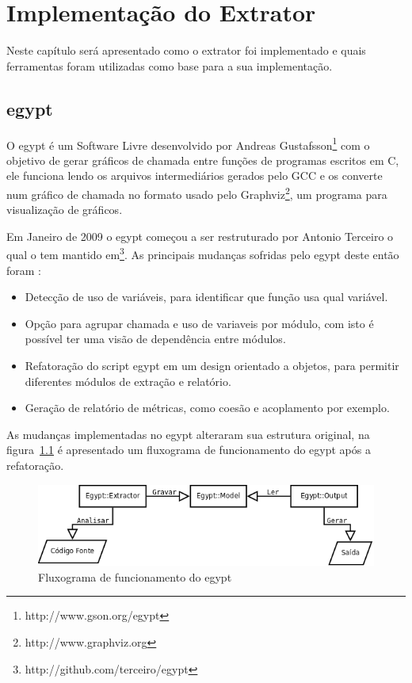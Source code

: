\chapter{Implementação do Extrator} \label{ch:implementacao}

Neste capítulo será apresentado como o extrator foi implementado e quais
ferramentas foram utilizadas como base para a sua implementação.

\section{egypt} \label{sec:egypt}

O egypt é um Software Livre desenvolvido por Andreas
Gustafsson\footnote{http://www.gson.org/egypt} com o objetivo de gerar gráficos
de chamada entre funções de programas escritos em C, ele funciona lendo os
arquivos intermediários gerados pelo GCC e os
converte num gráfico de chamada no formato usado pelo
Graphviz\footnote{http://www.graphviz.org}, um programa para visualização de
gráficos.

Em Janeiro de 2009 o egypt começou a ser restruturado por
Antonio Terceiro o qual o tem mantido
em\footnote{http://github.com/terceiro/egypt}. As principais mudanças sofridas
pelo egypt deste então foram \cite{structuralComplexityEvolution}:

\begin{itemize}
\item Detecção de uso de variáveis, para identificar que função usa qual
variável.
\item Opção para agrupar chamada e uso de variaveis por módulo, com isto é
possível ter uma visão de dependência entre módulos.
\item Refatoração do script egypt em um design orientado a objetos, para
permitir diferentes módulos de extração e relatório.
\item Geração de relatório de métricas, como coesão e acoplamento por exemplo.
\end{itemize}

As mudanças implementadas no egypt alteraram sua estrutura original, na
figura~\ref{fig:egypt-fluxogram} é apresentado um fluxograma de funcionamento
do egypt após a refatoração.

\begin{figure}[h]
\center
\includegraphics[scale=0.4]{imagens/egypt-fluxogram}
\caption{Fluxograma de funcionamento do egypt}
\label{fig:egypt-fluxogram}
\end{figure}

